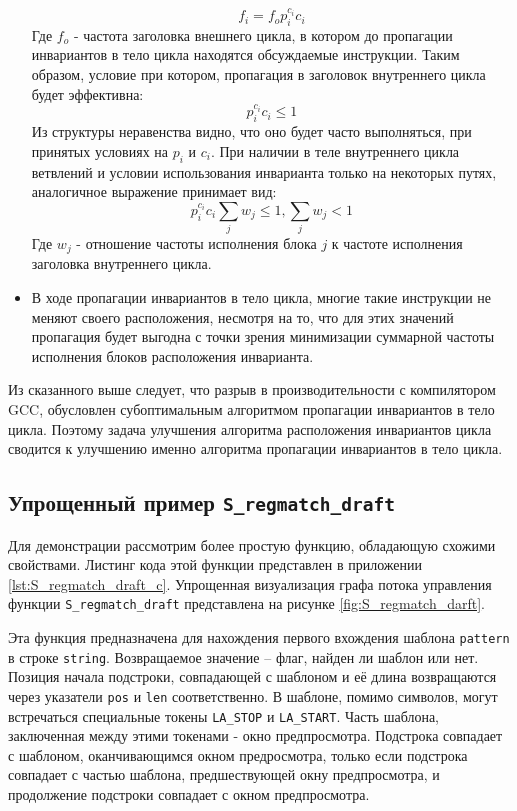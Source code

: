 \begin{itemize}
        $$ f_i = f_o  p_i^{c_i}  c_i $$
        Где $f_o$ - частота заголовка внешнего цикла, в котором до пропагации инвариантов в тело цикла находятся обсуждаемые инструкции.
        Таким образом, условие при котором, пропагация в заголовок внутреннего цикла будет эффективна:
        $$ p_i^{c_i}  c_i \leq 1 $$
        Из структуры неравенства видно, что оно будет часто выполняться, при принятых условиях на $p_i$ и $c_i$.
        При наличии в теле внутреннего цикла ветвлений и условии использования инварианта только на некоторых путях, аналогичное выражение принимает вид:
        $$ p_i^{c_i} c_i \sum_j{w_j} \leq 1 , \sum_j{w_j} < 1 $$
        Где $w_j$ - отношение частоты исполнения блока $j$ к частоте исполнения заголовка внутреннего цикла.
    \item В ходе пропагации инвариантов в тело цикла, многие такие инструкции не меняют своего расположения, несмотря на то, что для этих значений пропагация будет выгодна с точки зрения минимизации суммарной частоты исполнения блоков расположения инварианта.
\end{itemize}

Из сказанного выше следует, что разрыв в производительности с компилятором GCC, обусловлен субоптимальным алгоритмом пропагации инвариантов в тело цикла.
Поэтому задача улучшения алгоритма расположения инвариантов цикла сводится к улучшению именно алгоритма пропагации инвариантов в тело цикла.

\subsection{Упрощенный пример \texttt{S\_regmatch\_draft}}

Для демонстрации рассмотрим более простую функцию, обладающую схожими свойствами.
Листинг кода этой функции представлен в приложении \ref{lst:S_regmatch_draft_c}.
Упрощенная визуализация графа потока управления функции \texttt{S\_regmatch\_draft} представлена на рисунке \ref{fig:S_regmatch_darft}.

Эта функция предназначена для нахождения первого вхождения шаблона \texttt{pattern} в строке \texttt{string}.
Возвращаемое значение -- флаг, найден ли шаблон или нет.
Позиция начала подстроки, совпадающей с шаблоном и её длина возвращаются через указатели \texttt{pos} и \texttt{len} соответственно.
В шаблоне, помимо символов, могут встречаться специальные токены \texttt{LA\_STOP} и \texttt{LA\_START}.
Часть шаблона, заключенная между этими токенами - окно предпросмотра.
Подстрока совпадает с шаблоном, оканчивающимся окном предросмотра, только если подстрока совпадает с частью шаблона, предшествующей окну предпросмотра, и продолжение подстроки совпадает с окном предпросмотра.

